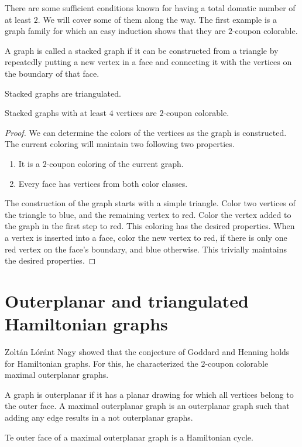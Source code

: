 There are some sufficient conditions known for having a total domatic number of
at least $2$. We will cover some of them along the way.
The first example is a graph family for which an easy induction shows that they
are $2$-coupon colorable.

\begin{definition}
  A graph is called a stacked graph if it can be constructed from a triangle by
  repeatedly putting a new vertex in a face and connecting it with the vertices on
  the boundary of that face.
\end{definition}
\begin{remark}
  Stacked graphs are triangulated.
\end{remark}
\begin{claim}
  Stacked graphs with at least $4$ vertices are $2$-coupon colorable.
\end{claim}
\begin{proof}
  We can determine the colors of the vertices as the graph is constructed. The
  current coloring will maintain two following two properties.
  \begin{enumerate}
    \item It is a $2$-coupon coloring of the current graph.
    \item Every face has vertices from both color classes.
  \end{enumerate}
  The construction of the graph starts with a simple triangle. Color two vertices
  of the triangle to blue, and the remaining vertex to red. Color the vertex added
  to the graph in the first step to red. This coloring has the desired properties.
  When a vertex is inserted into a face, color the new vertex to red, if there is
  only one red vertex on the face's boundary, and blue otherwise. This trivially
  maintains the desired properties.
\end{proof}

\section{Outerplanar and triangulated Hamiltonian graphs}
Zoltán Lóránt Nagy showed that the conjecture of Goddard and Henning holds for
Hamiltonian graphs. For this, he characterized the $2$-coupon colorable
maximal outerplanar graphs.

\begin{definition}
   A graph is outerplanar if it has a planar drawing for which all vertices
   belong to the outer face. A maximal outerplanar graph is an outerplanar graph
   such that adding any edge results in a not outerplanar graphs.
\end{definition}
\begin{remark}
  Te outer face of a maximal outerplanar graph is a Hamiltonian cycle.
\end{remark}

